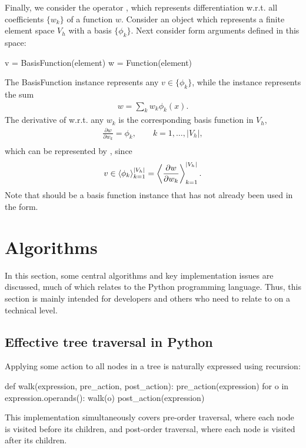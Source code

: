 Finally, we consider the operator , which represents
differentiation w.r.t. all coefficients $\{w_k\}$ of a function $w$.
Consider an object  which represents a finite element
space $V_h$ with a basis $\{\phi_k\}$.  Next consider form arguments
defined in this space:
\begin{code}
v = BasisFunction(element)
w = Function(element)
\end{code}
The BasisFunction instance  represents any $v\in\{\phi_k\}$,
while the  instance  represents the sum
\begin{align}
w = \sum_k w_k \phi_k(x).
\end{align}
The derivative of  w.r.t. any $w_k$ is the corresponding basis function in $V_h$,
\begin{align}
\frac{\partial w}{\partial w_k} = \phi_k, \qquad k = 1, \ldots, |V_h|, \\
\end{align}
which can be represented by , since
\begin{align}
v \in \left\langle{ \phi_k }\right\rangle_{k=1}^{|V_h|} = \left\langle{ \frac{\partial w}{\partial w_k} }\right\rangle_{k=1}^{|V_h|}.
\end{align}
Note that  should be a basis function instance that has not
already been used in the form.

\section{Algorithms} \label{ufl:sec:algorithms}

In this section, some central algorithms and key implementation issues
are discussed, much of which relates to the Python programming
language.  Thus, this section is mainly intended for developers and
others who need to relate to \ufl{} on a technical level.

\subsection{Effective tree traversal in Python} \label{ufl:sec:traversal}

Applying some action to all nodes in a tree is naturally expressed
using recursion:
\begin{code}
def walk(expression, pre_action, post_action):
    pre_action(expression)
    for o in expression.operands():
        walk(o)
    post_action(expression)
\end{code}
This implementation simultaneously covers pre-order traversal, where
each node is visited before its children, and post-order traversal,
where each node is visited after its children.


